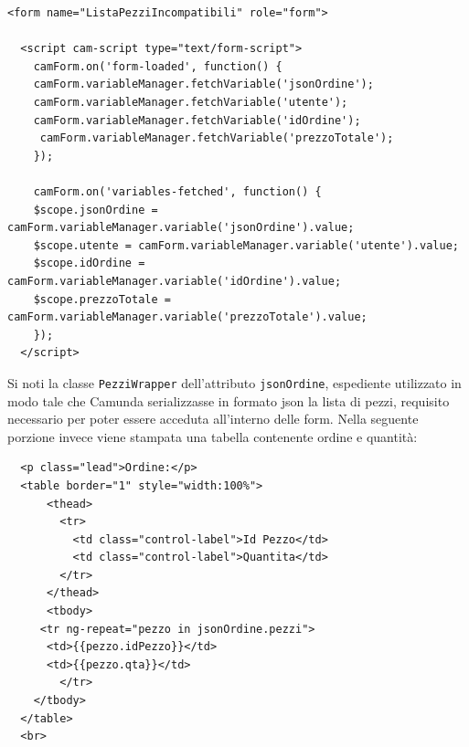 \documentclass[twoside]{article}
\begin{document}
\begin{lstlisting}
<form name="ListaPezziIncompatibili" role="form">
  
  <script cam-script type="text/form-script">
    camForm.on('form-loaded', function() {
    camForm.variableManager.fetchVariable('jsonOrdine');
    camForm.variableManager.fetchVariable('utente');
    camForm.variableManager.fetchVariable('idOrdine');
     camForm.variableManager.fetchVariable('prezzoTotale');
    });
    
    camForm.on('variables-fetched', function() {
    $scope.jsonOrdine = camForm.variableManager.variable('jsonOrdine').value;
    $scope.utente = camForm.variableManager.variable('utente').value;
    $scope.idOrdine = camForm.variableManager.variable('idOrdine').value;
    $scope.prezzoTotale = camForm.variableManager.variable('prezzoTotale').value;
    });
  </script>
\end{lstlisting}

Si noti la classe \texttt{PezziWrapper} dell'attributo \texttt{jsonOrdine}, espediente
utilizzato in modo tale che Camunda serializzasse in formato json la lista di pezzi,
requisito necessario per poter essere acceduta all'interno delle form.
Nella seguente porzione invece viene stampata una tabella contenente ordine e quantità:
\begin{lstlisting}
  <p class="lead">Ordine:</p>
  <table border="1" style="width:100%">
      <thead>
        <tr>
          <td class="control-label">Id Pezzo</td>
          <td class="control-label">Quantita</td>
        </tr>
      </thead>
      <tbody>
     <tr ng-repeat="pezzo in jsonOrdine.pezzi">
      <td>{{pezzo.idPezzo}}</td>
      <td>{{pezzo.qta}}</td>
        </tr>
    </tbody>
  </table>
  <br>
\end{lstlisting}
\end{document}
